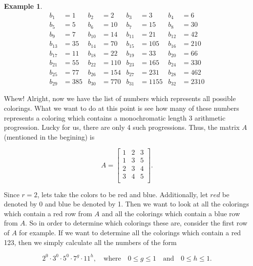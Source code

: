 \documentclass{article}
\theoremstyle{definition}
\theoremstyle{remark}
\theoremstyle{definition}
\newtheorem{example}{Example}[section]
\begin{document}
\begin{example}
    \newpage
    
    \begin{align*}
            b_1 & = 1  &b_2 &=  2 &b_3 &=  3 &b_4 &=  6 \\ 
            b_5 &= 5 &b_6 &=  10 &b_7 &=  15 &b_8 &= 30 \\ 
            b_9 &= 7  &b_{10} &=  14 &b_{11} &=  21 &b_{12} &=  42 \\
            b_{13} &=  35 &b_{14} &=  70 &b_{15} &=  105 &b_{16} &=  210 \\ 
            b_{17} &=  11 &b_{18} &=  22 &b_{19} &=  33 &b_{20} &=  66 \\ 
            b_{21} &=  55 &b_{22} &=  110 &b_{23} &=  165 &b_{24} &=  330 \\ 
            b_{25} &=  77 &b_{26} &=  154 &b_{27} &=  231 &b_{28} &=  462 \\ 
            b_{29} &=  385 &b_{30} &=  770 &b_{31} &=  1155 &b_{32} &=  2310 
    \end{align*}
    

    
    \noindent Whew! Alright, now we have the list of numbers which represents all possible colorings. What we want to do at this point is see how many of these numbers represents a coloring which contains a monochromatic length 3 arithmetic progression. Lucky for us, there are only 4 such progressions. Thus, the matrix $A$ (mentioned in the begining) is
    
    \begin{equation*}
        A=\begin{bmatrix} 1 & 2 & 3 \\ 1  & 3 & 5 \\ 2 & 3 & 4 \\ 3 & 4 & 5 \\ \end{bmatrix}.
    \end{equation*}
    
     Since $r=2$, lets take the colors to be red and blue. Additionally, let $red$ be denoted by 0 and blue be denoted by 1. Then we want to look at all the colorings which contain a red row from $A$ and all the colorings which contain a blue row from $A$. So in order to determine which colorings these are, consider the first row of $A$ for example. If we want to determine all the colorings which contain a red 123, then we simply calculate all the numbers of the form 
    
    \begin{equation}
        2^0\cdot3^0\cdot5^0\cdot7^g\cdot 11^h, \quad \text{where}\quad 0\leq g\leq 1\quad\text{and}\quad 0\leq h\leq 1.
    \end{equation}
    

\end{example}
\end{document}
